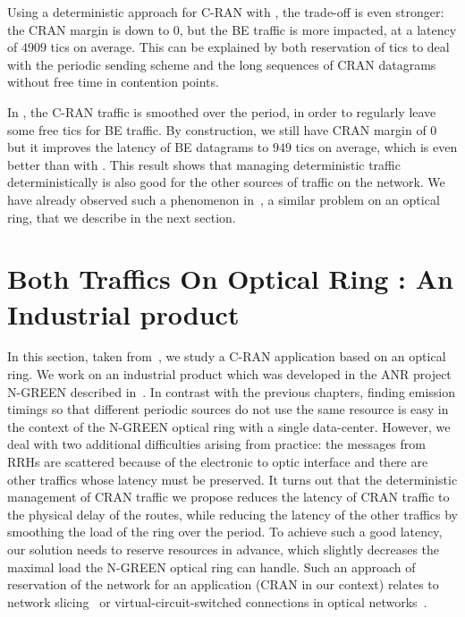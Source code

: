      Using a deterministic approach for C-RAN with \PMLS, the trade-off is even stronger:
      the CRAN margin is down to $0$, but the BE traffic is more impacted, at a latency of $4909$ tics on average. This can be explained by both reservation of tics to deal with the periodic sending scheme and the long sequences of CRAN datagrams without free time in contention points.
     
     In \SPMLS, the C-RAN traffic is smoothed over the period, in order to regularly leave some free tics for BE traffic. By construction, we still have CRAN margin of $0$ but it improves the latency of 
     BE datagrams to $949$ tics on average, which is even better than with \FIFO. 
     This result shows that managing deterministic traffic deterministically is also good for the other sources of traffic on the network. We have already observed such a phenomenon in~\cite{DBLP:conf/ondm/BarthGS19}, a similar 
     problem on an optical ring, that we describe in the next section.
     
   


\section{Both Traffics On Optical Ring : An Industrial product}


In this section, taken from~\cite{DBLP:conf/ondm/BarthGS19}, we study a C-RAN application based on an optical ring. We work on an industrial product which was developed in the ANR project N-GREEN described in~\cite{ngreenarchitecture,uscumlic2018scalable}.
In contrast with the previous chapters, finding emission timings so that different periodic sources do not use the same resource is easy in the context of the N-GREEN optical ring with a single data-center. However, we deal with two additional difficulties arising from practice: the messages from RRHs are scattered because of the electronic to optic interface and there are other traffics whose latency must be preserved. It turns out that the deterministic management of CRAN traffic we propose reduces the latency of CRAN traffic to the physical delay of the routes, while reducing the latency of the other traffics by smoothing the load of the ring over the period. To achieve such a good latency, our solution needs to reserve resources in advance, which slightly decreases the maximal load the N-GREEN optical ring can handle. Such an approach of reservation of the network for an application (CRAN in our context) relates to network slicing~\cite{jiang2016network} or virtual-circuit-switched connections in optical networks~\cite{cadere2010virtual,szymanski2016ultra}.

